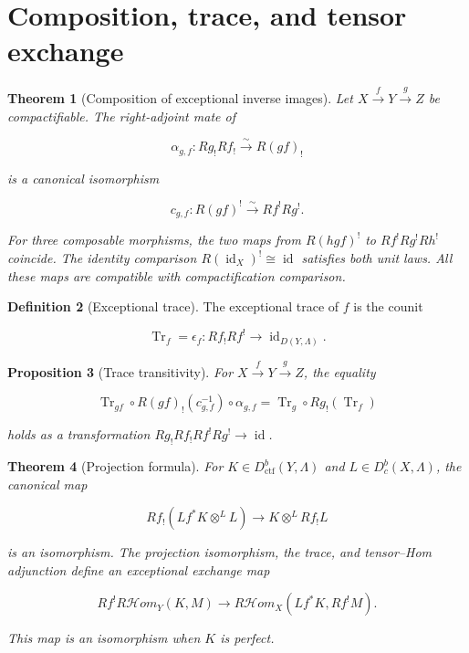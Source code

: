 \documentclass[10pt]{article}
\newtheorem{theorem}{Theorem}[section]
\newtheorem{proposition}[theorem]{Proposition}
\theoremstyle{definition}
\newtheorem{definition}[theorem]{Definition}
\newcommand{\Dbc}{D^b_c}
\newcommand{\Dctf}{D^b_{\mathrm{ctf}}}
\begin{document}
\section{Composition, trace, and tensor exchange}

\begin{theorem}[Composition of exceptional inverse images]
Let \(X\xrightarrow fY\xrightarrow gZ\) be compactifiable.  The
right-adjoint mate of

\[
 \alpha_{g,f}:Rg_!Rf_!\xrightarrow{\sim}R(gf)_!
\]

is a canonical isomorphism

\[
 c_{g,f}:R(gf)^!\xrightarrow{\sim}Rf^!Rg^!.
\]

For three composable morphisms, the two maps from \(R(hgf)^!\) to
\(Rf^!Rg^!Rh^!\) coincide.  The identity comparison
\(R(\operatorname{id}_X)^!\cong\operatorname{id}\) satisfies both unit
laws.  All these maps are compatible with compactification comparison.
\end{theorem}

\begin{definition}[Exceptional trace]
The exceptional trace of \(f\) is the counit

\[
 \operatorname{Tr}_f=\epsilon_f:Rf_!Rf^!\longrightarrow
 \operatorname{id}_{D(Y,\Lambda)}.
\]
\end{definition}

\begin{proposition}[Trace transitivity]
For \(X\xrightarrow fY\xrightarrow gZ\), the equality

\[
 \operatorname{Tr}_{gf}\circ
 R(gf)_!(c_{g,f}^{-1})\circ\alpha_{g,f}
 =\operatorname{Tr}_g\circ Rg_!(\operatorname{Tr}_f)
\]

holds as a transformation \(Rg_!Rf_!Rf^!Rg^!\to\operatorname{id}\).
\end{proposition}

\begin{theorem}[Projection formula]
For \(K\in\Dctf(Y,\Lambda)\) and \(L\in\Dbc(X,\Lambda)\), the canonical map

\[
 Rf_!(Lf^*K\otimes^L L)
 \longrightarrow K\otimes^L Rf_!L
\]

is an isomorphism.  The projection isomorphism, the trace, and tensor--Hom
adjunction define
an exceptional exchange map

\[
 Rf^!R\mathcal Hom_Y(K,M)
 \longrightarrow
 R\mathcal Hom_X(Lf^*K,Rf^!M).
\]

This map is an isomorphism when \(K\) is perfect.
\end{theorem}
\end{document}
